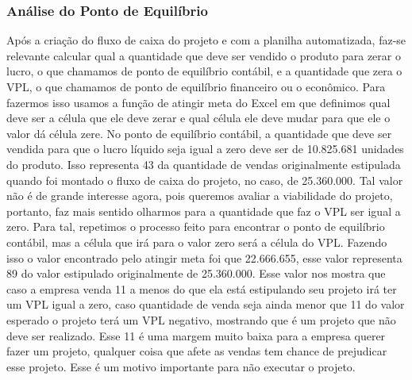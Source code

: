 \documentclass[11pt]{article}
\begin{document}
\subsubsection{\textbf{Análise do Ponto de Equilíbrio}}
Após a criação do fluxo de caixa do projeto e com a planilha automatizada, faz-se relevante calcular qual a quantidade que deve ser vendido o produto para zerar o lucro, o que chamamos de ponto de equilíbrio contábil, e a quantidade que zera o VPL, o que chamamos de ponto de equilíbrio financeiro ou o econômico.
Para fazermos isso usamos a função de atingir meta do Excel em que definimos qual deve ser a célula que ele deve zerar e qual célula ele deve mudar para que ele o valor dá célula zere.
No ponto de equilíbrio contábil, a quantidade que deve ser vendida para que o lucro líquido seja igual a zero deve ser de 10.825.681 unidades do produto. Isso representa 43
da quantidade de vendas originalmente estipulada quando foi montado o fluxo de caixa do projeto, no caso, de 25.360.000.
Tal valor não é de grande interesse agora, pois queremos avaliar a viabilidade do projeto, portanto, faz mais sentido olharmos para a quantidade que faz o VPL ser igual a zero. Para tal, repetimos o processo feito para encontrar o ponto de equilíbrio contábil, mas a célula que irá para o valor zero será a célula do VPL. Fazendo isso o valor encontrado pelo atingir meta foi que 22.666.655, esse valor representa 89 do valor estipulado originalmente de 25.360.000. Esse valor nos mostra que caso a empresa venda 11 a menos do que ela está estipulando seu projeto irá ter um VPL igual a zero, caso quantidade de venda seja ainda menor que 11 do valor esperado o projeto terá um VPL negativo, mostrando que é um projeto que não deve ser realizado.
Esse 11 é uma margem muito baixa para a empresa querer fazer um projeto, qualquer coisa que afete as vendas tem chance de prejudicar esse projeto. Esse é um motivo importante para não executar o projeto.
\end{document}
